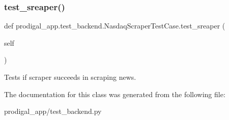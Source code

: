 \subsubsection{\texorpdfstring{test\+\_\+sreaper()}{test\_sreaper()}}
{\footnotesize\ttfamily def prodigal\+\_\+app.\+test\+\_\+backend.\+Nasdaq\+Scraper\+Test\+Case.\+test\+\_\+sreaper (\begin{DoxyParamCaption}\item[{}]{self }\end{DoxyParamCaption})}

\begin{DoxyVerb}Tests if scraper succeeds in scraping news.
\end{DoxyVerb}
 

The documentation for this class was generated from the following file\+:\begin{DoxyCompactItemize}
\item 
prodigal\+\_\+app/test\+\_\+backend.\+py\end{DoxyCompactItemize}
